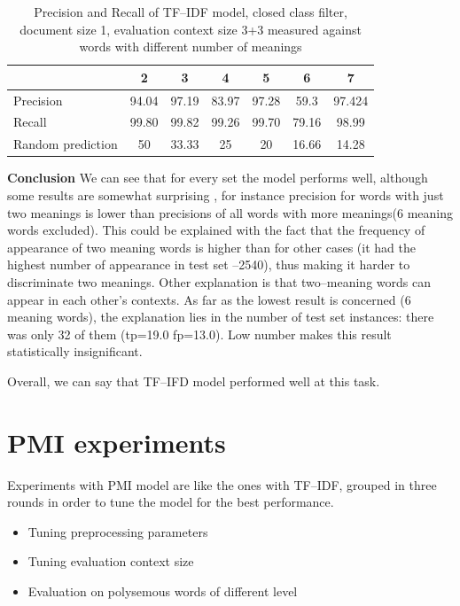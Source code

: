 \begin{table}[h!]
\begin{tabular}{ l | c c c c c c   }
     & 2 & 3 & 4 & 5 & 6& 7   \\
 \hline
Precision & 94.04 &97.19 &83.97 &97.28 &59.3 &97.424 \\
Recall   &  99.80 &99.82 &99.26 &99.70 &79.16 &98.99   \\
Random prediction    & 50 & 33.33 & 25 & 20 & 16.66 & 14.28      \\
\end{tabular}
\caption{Precision and Recall of TF--IDF model, closed class filter, document size 1, evaluation context size 3+3 measured against words with different number of meanings}
\end{table} 

\textbf{Conclusion}
We can see that for every set the model performs well, although some results are somewhat surprising
, for instance precision for words with just two meanings is lower than precisions of all words with 
more meanings(6 meaning words excluded). This could be explained with the fact that the frequency of appearance 
of two meaning  words is higher than for other cases (it had the highest number of appearance in test
set --2540), thus making it harder to discriminate two meanings. Other explanation is that two--meaning words can appear in each other's contexts. As far as the lowest result is concerned (6 meaning words), the explanation lies in the number of test set instances: there was only 32 of them (tp=19.0 fp=13.0). Low number makes this result statistically insignificant. 

Overall, we can say that TF--IFD model performed well at this task. 

\section{PMI experiments} 
Experiments  with PMI model are like the ones with TF--IDF, grouped in three rounds in order to tune
the model for the best performance. 
\begin{itemize}
\item Tuning preprocessing parameters
\item Tuning evaluation context size
\item Evaluation on polysemous words of different level
\end{itemize}

